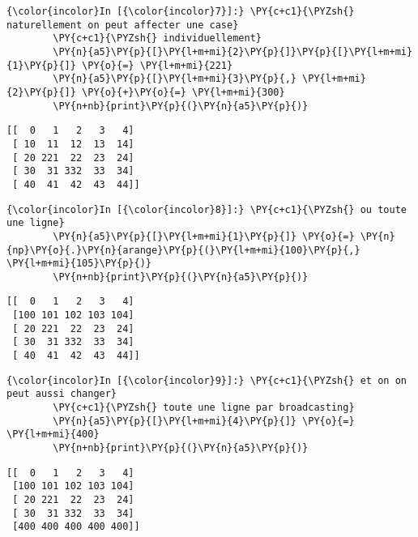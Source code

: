     \begin{Verbatim}[commandchars=\\\{\}]
{\color{incolor}In [{\color{incolor}7}]:} \PY{c+c1}{\PYZsh{} naturellement on peut affecter une case}
        \PY{c+c1}{\PYZsh{} individuellement}
        \PY{n}{a5}\PY{p}{[}\PY{l+m+mi}{2}\PY{p}{]}\PY{p}{[}\PY{l+m+mi}{1}\PY{p}{]} \PY{o}{=} \PY{l+m+mi}{221}
        \PY{n}{a5}\PY{p}{[}\PY{l+m+mi}{3}\PY{p}{,} \PY{l+m+mi}{2}\PY{p}{]} \PY{o}{+}\PY{o}{=} \PY{l+m+mi}{300}
        \PY{n+nb}{print}\PY{p}{(}\PY{n}{a5}\PY{p}{)}
\end{Verbatim}


    \begin{Verbatim}[commandchars=\\\{\}]
[[  0   1   2   3   4]
 [ 10  11  12  13  14]
 [ 20 221  22  23  24]
 [ 30  31 332  33  34]
 [ 40  41  42  43  44]]

    \end{Verbatim}

    \begin{Verbatim}[commandchars=\\\{\}]
{\color{incolor}In [{\color{incolor}8}]:} \PY{c+c1}{\PYZsh{} ou toute une ligne}
        \PY{n}{a5}\PY{p}{[}\PY{l+m+mi}{1}\PY{p}{]} \PY{o}{=} \PY{n}{np}\PY{o}{.}\PY{n}{arange}\PY{p}{(}\PY{l+m+mi}{100}\PY{p}{,} \PY{l+m+mi}{105}\PY{p}{)}
        \PY{n+nb}{print}\PY{p}{(}\PY{n}{a5}\PY{p}{)}
\end{Verbatim}


    \begin{Verbatim}[commandchars=\\\{\}]
[[  0   1   2   3   4]
 [100 101 102 103 104]
 [ 20 221  22  23  24]
 [ 30  31 332  33  34]
 [ 40  41  42  43  44]]

    \end{Verbatim}

    \begin{Verbatim}[commandchars=\\\{\}]
{\color{incolor}In [{\color{incolor}9}]:} \PY{c+c1}{\PYZsh{} et on on peut aussi changer}
        \PY{c+c1}{\PYZsh{} toute une ligne par broadcasting}
        \PY{n}{a5}\PY{p}{[}\PY{l+m+mi}{4}\PY{p}{]} \PY{o}{=} \PY{l+m+mi}{400}
        \PY{n+nb}{print}\PY{p}{(}\PY{n}{a5}\PY{p}{)}
\end{Verbatim}


    \begin{Verbatim}[commandchars=\\\{\}]
[[  0   1   2   3   4]
 [100 101 102 103 104]
 [ 20 221  22  23  24]
 [ 30  31 332  33  34]
 [400 400 400 400 400]]

    \end{Verbatim}

